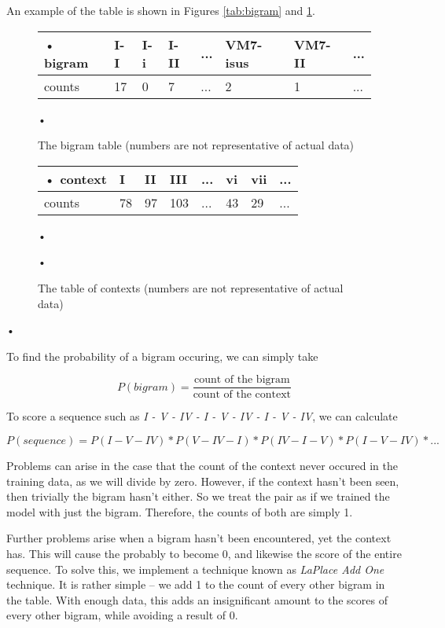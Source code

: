 \documentclass{article}
\begin{document}
An example of the table is shown in Figures \ref{tab:bigram} and \ref{tab:context}.

	\begin{figure}[h]

	\begin{center}
		\begin{tabular}{l | l | l | l | l | l | l | l}
•		bigram &	I-I 	& I-i	& I-II	& ...	& VM7-isus	& VM7-II	& ... \\ \hline
		counts & 17	& 0	& 7	& ...	& 2			& 1		& ... \\
		\end{tabular}•
	\end{center}
	\caption{The bigram table (numbers are not representative of actual data)}
	\label{tab:bigram}

	
	\begin{center}
		\begin{tabular}{l|l|l|l|l|l|l|l}
•		context	&	I 	&	II	&	III	&	...	&	vi	&	vii	&	...	\\[0.3em] \hline
		counts	&	78	&	97	&	103	&	...	&	43	&	29	&	...	\\
		\end{tabular}•
	\end{center}•
	\caption{The table of contexts (numbers are not representative of actual data)}
	\label{tab:context}
	\end{figure}•

To find the probability of a bigram occuring, we can simply take

	\[
	P(bigram) = \frac{\text{count of the bigram}}{\text{count of the context}}
	\]

To score a sequence such as \emph{I - V - IV - I - V - IV - I - V - IV}, we can calculate

	\[
	P(sequence) = P(I - V - IV) * P(V - IV - I) * P(IV - I - V) * P(I - V - IV) * ...
	\]

Problems can arise in the case that the count of the context never occured
in the training data,
as we will divide by zero. However, if the context hasn't been seen, then
trivially the bigram hasn't either. So we treat the pair as if we trained the
model with just the bigram. Therefore, the counts of both are simply 1.

Further problems arise when a bigram hasn't been encountered, yet the 
context has. This will cause the probably to become 0, and likewise the
score of the entire sequence. To solve this, we implement a technique 
known as \emph{LaPlace Add One} technique. It is rather simple -- we add
1 to the count of every other bigram in the table. With enough data, this
adds an insignificant amount to the scores of every other bigram,
while avoiding a result of 0.
\end{document}
